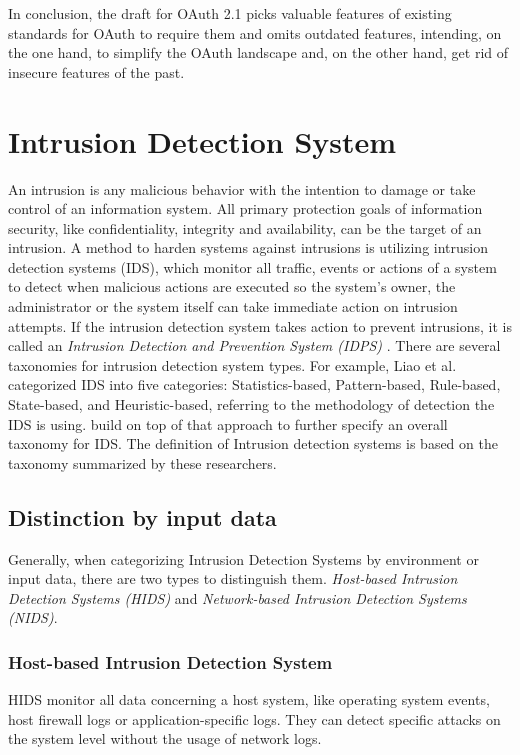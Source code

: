 In conclusion, the draft for OAuth 2.1 picks valuable features of existing standards for OAuth to require them and omits outdated features, intending, on the one hand, to simplify the OAuth landscape and, on the other hand, get rid of insecure features of the past.

\section{Intrusion Detection System}
An intrusion is any malicious behavior with the intention to damage or take control of an information system. All primary protection goals of information security, like confidentiality, integrity and availability, can be the target of an intrusion. A method to harden systems against intrusions is utilizing intrusion detection systems (IDS), which monitor all traffic, events or actions of a system to detect when malicious actions are executed so the system's owner, the administrator or the system itself can take immediate action on intrusion attempts. If the intrusion detection system takes action to prevent intrusions, it is called an \emph{Intrusion Detection and Prevention System (IDPS)} \cite{scarfone2010intrusion}. There are several taxonomies for intrusion detection system types. For example, Liao et al. \cite{Liao2013IntrusionDS} categorized IDS into five categories: Statistics-based, Pattern-based, Rule-based, State-based, and Heuristic-based, referring to the methodology of detection the IDS is using. \cite{khraisat2019survey} build on top of that approach to further specify an overall taxonomy for IDS. The definition of Intrusion detection systems is based on the taxonomy summarized by these researchers.

\subsection{Distinction by input data}
Generally, when categorizing Intrusion Detection Systems by environment or input data, there are two types to distinguish them. 
\emph{Host-based Intrusion Detection Systems (HIDS)} and \emph{Network-based Intrusion Detection Systems (NIDS)}.
\subsubsection{Host-based Intrusion Detection System}
HIDS monitor all data concerning a host system, like operating system events, host firewall logs or application-specific logs. They can detect specific attacks on the system level without the usage of network logs.
